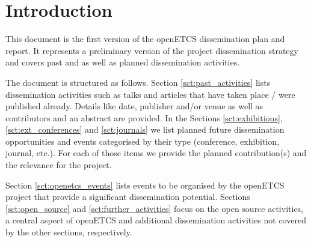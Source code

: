 ﻿\section{Introduction}

This document is the first version of the openETCS dissemination plan and report. It represents a preliminary version of the project dissemination strategy and covers past and as well as planned dissemination activities.

The document is structured as follows. Section \ref{sct:past_activities} lists dissemination activities such as talks and articles that have taken place / were published already. Details like date, publisher and/or venue as well as contributors and an abstract are provided. In the Sections \ref{sct:exhibitions}, \ref{sct:ext_conferences} and \ref{sct:journals} we list planned future dissemination opportunities and events categorised by their type (conference, exhibition, journal, etc.). For each of those items we provide the planned contribution(s) and the relevance for the project.

Section \ref{sct:openetcs_events} lists events to be organised by the openETCS project that provide a significant dissemination potential. Sections \ref{sct:open_source} and \ref{sct:further_activities} focus on the open source activities, a central aspect of openETCS and additional dissemination activities not covered by the other sections, respectively.
